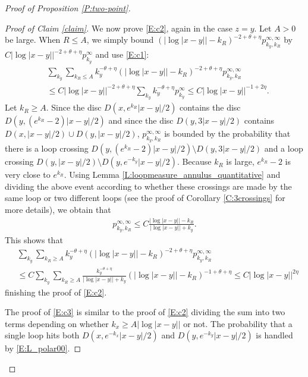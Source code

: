 \documentclass[11pt]{article}
\theoremstyle{remark}
\numberwithin{equation}{section}
\begin{document}
\begin{proof}[Proof of Proposition \ref{P:two-point}]
\begin{proof}[Proof of Claim \ref{claim}]
We now prove \eqref{E:c2}, again in the case $z = y$.
Let $A>0$ be large.
When $R \leq A$, we simply bound $( |\log |x-y|| - k_R )^{-2+\theta + \eta} p_{k_y,k_R}^{\infty,\infty}$ by $C|\log |x-y||^{-2+\theta + \eta} p_{k_y}^{\infty}$ and use \eqref{E:c1}:
\begin{align*}
& \sum_{k_y} \sum_{k_R \leq A} k_y^{-\theta+\eta} ( |\log |x-y|| - k_R )^{-2+\theta + \eta} p_{k_y,k_R}^{\infty,\infty} \\
& \leq C |\log |x-y||^{-2+\theta + \eta} \sum_{k_y} k_y^{-\theta+\eta} p_{k_y}^{\infty} \leq C |\log |x-y||^{-1 + 2\eta}.
\end{align*}
Let $k_R \geq A$. Since the disc $D(x,e^{k_R}|x-y|/2)$ contains the disc $D(y,(e^{k_R}-2)|x-y|/2)$ and since the disc $D(y, 3|x-y|/2)$ contains $D(x,|x-y|/2) \cup D(y,|x-y|/2)$, $p_{k_y,k_R}^{\infty,\infty}$ is bounded by the probability that there is a loop crossing $D(y,(e^{k_R}-2)|x-y|/2) \setminus  D(y, 3|x-y|/2)$ and a loop crossing $D(y,|x-y|/2) \setminus D(y,e^{-k_y}|x-y|/2)$. Because $k_R$ is large, $e^{k_R} - 2$ is very close to $e^{k_R}$. Using Lemma \ref{L:loopmeasure_annulus_quantitative} and dividing the above event according to whether these crossings are made by the same loop or two different loops (see the proof of Corollary \ref{C:3crossings} for more details), we obtain that
\begin{align*}
p_{k_y,k_R}^{\infty,\infty} \leq C \frac{|\log|x-y|| - k_R}{|\log|x-y||+k_y}.
\end{align*}
This shows that 
\begin{align*}
& \sum_{k_y} \sum_{k_R \geq A} k_y^{-\theta+\eta} ( |\log |x-y|| - k_R )^{-2+\theta + \eta} p_{k_y,k_R}^{\infty,\infty} \\
& \leq C \sum_{k_y} \sum_{k_R \geq A} \frac{k_y^{-\theta+\eta}}{|\log|x-y||+k_y} ( |\log |x-y|| - k_R )^{-1+\theta + \eta}
\leq C |\log |x-y||^{2\eta}
\end{align*}
finishing the proof of \eqref{E:c2}.

The proof of \eqref{E:c3} is similar to the proof of \eqref{E:c2} dividing the sum into two terms depending on whether $k_x \geq A |\log |x-y||$ or not. The probability that a single loop hits both $D(x,e^{-k_x}|x-y|/2)$ and $D(y,e^{-k_y}|x-y|/2)$ is handled by \eqref{E:L_polar00}.


\end{proof}
\end{proof}
\end{document}

